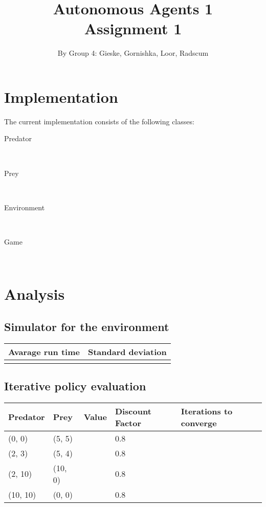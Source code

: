 \documentclass{article}
\begin{document}
\title{Autonomous Agents 1 \\ Assignment 1}

\author{By Group 4: Gieske, Gornishka, Loor, Radscum}
\maketitle

\section*{Implementation}

\noindent The current implementation consists of the following classes:
\begin{description}
	\item[Predator] \hfill \\ 
	
	\item[Prey] \hfill \\ 
	
	\item[Environment] \hfill \\ 
	
	\item[Game] \hfill \\ 
	
\end{description}


\section*{Analysis}


\subsection*{Simulator for the environment}


\begin{center}
	\begin{tabular}{  l ||  l }
		Avarage run time & Standard deviation \\ 
		\hline
		 & %
	\end{tabular}
\end{center}

\subsection*{Iterative policy evaluation}


\begin{center}
	\begin{tabular}{ l | l | l | l | l }
		Predator & Prey & Value & Discount Factor & Iterations to converge \\ 
		\hline
		(0, 0) & (5, 5) & & 0.8 & \\
		(2, 3) & (5, 4) & & 0.8 & \\
		(2, 10) & (10, 0) & & 0.8 & \\
		(10, 10) & (0, 0) & & 0.8 & \\	
	\end{tabular}
\end{center}
\end{document}
